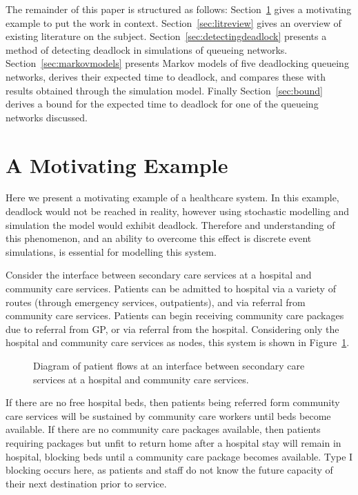\documentclass{article}
\numberwithin{equation}{section}
\begin{document}
The remainder of this paper is structured as follows:
Section~\ref{sec:motivatingexample} gives a motivating example to put the work
in context.
Section~\ref{sec:litreview} gives an overview of existing literature on the
subject.
Section~\ref{sec:detectingdeadlock} presents a method of detecting deadlock in
simulations of queueing networks.
Section~\ref{sec:markovmodels} presents Markov models of five deadlocking
queueing networks, derives their expected time to deadlock, and compares these
with results obtained through the simulation model.
Finally Section~\ref{sec:bound} derives a bound for the expected time to
deadlock for one of the queueing networks discussed.




\section{A Motivating Example}\label{sec:motivatingexample}

Here we present a motivating example of a healthcare system.
In this example, deadlock would not be reached in reality, however using
stochastic modelling and simulation the model would exhibit deadlock.
Therefore and understanding of this phenomenon, and an ability to overcome
this effect is discrete event simulations, is essential for modelling this
system.

Consider the interface between secondary care services at a hospital and
community care services.
Patients can be admitted to hospital via a variety of routes (through
emergency services, outpatients), and via referral from community care
services.
Patients can begin receiving community care packages due to referral from GP,
or via referral from the hospital.
Considering only the hospital and community care services as nodes, this
system is shown in Figure~\ref{fig:motivatingexample}.

\begin{figure}
\begin{center}

\end{center}
\caption{Diagram of patient flows at an interface between secondary care
services at a hospital and community care services.}
\label{fig:motivatingexample}
\end{figure}

If there are no free hospital beds, then patients being referred form
community care services will be sustained by community care workers until beds
become available.
If there are no community care packages available, then patients requiring
packages but unfit to return home after a hospital stay will remain in
hospital, blocking beds until a community care package becomes available.
Type I blocking occurs here, as patients and staff do not know the future
capacity of their next destination prior to service.
\end{document}

